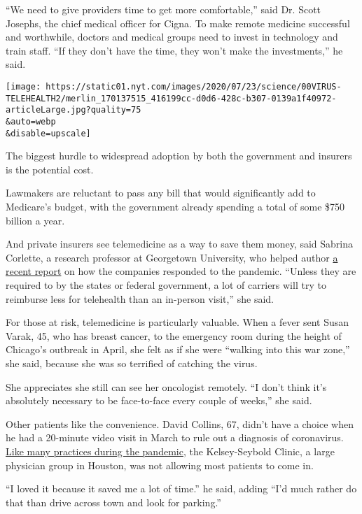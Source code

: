 ``We need to give providers time to get more comfortable,'' said Dr.
Scott Josephs, the chief medical officer for Cigna. To make remote
medicine successful and worthwhile, doctors and medical groups need to
invest in technology and train staff. ``If they don't have the time,
they won't make the investments,'' he said.

\texttt{[image: https://static01.nyt.com/images/2020/07/23/science/00VIRUS-TELEHEALTH2/merlin\_170137515\_416199cc-d0d6-428c-b307-0139a1f40972-articleLarge.jpg?quality=75\\\&auto=webp\\\&disable=upscale]}

The biggest hurdle to widespread adoption by both the government and
insurers is the potential cost.

Lawmakers are reluctant to pass any bill that would significantly add to
Medicare's budget, with the government already spending a total of some
\$750 billion a year.

And private insurers see telemedicine as a way to save them money, said
Sabrina Corlette, a research professor at Georgetown University, who
helped author
\href{https://www.rwjf.org/en/library/research/2020/06/the-covid-19-pandemic-insurer-insights-into-challenges-implications-and-lessons-learned.html?cid=xem_other_unpd_ini:moni_dte:20200629_des:insurer\%20insight}{a
recent report} on how the companies responded to the pandemic. ``Unless
they are required to by the states or federal government, a lot of
carriers will try to reimburse less for telehealth than an in-person
visit,'' she said.

For those at risk, telemedicine is particularly valuable. When a fever
sent Susan Varak, 45, who has breast cancer, to the emergency room
during the height of Chicago's outbreak in April, she felt as if she
were ``walking into this war zone,'' she said, because she was so
terrified of catching the virus.

She appreciates she still can see her oncologist remotely. ``I don't
think it's absolutely necessary to be face-to-face every couple of
weeks,'' she said.

Other patients like the convenience. David Collins, 67, didn't have a
choice when he had a 20-minute video visit in March to rule out a
diagnosis of coronavirus.
\href{https://www.nytimes.com/2020/03/11/health/telemedicine-coronavirus.html}{Like
many practices during the pandemic}, the Kelsey-Seybold Clinic, a large
physician group in Houston, was not allowing most patients to come in.

``I loved it because it saved me a lot of time.'' he said, adding ``I'd
much rather do that than drive across town and look for parking.''

